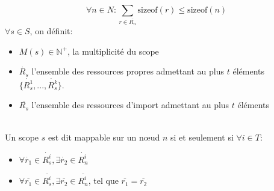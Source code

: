 \documentclass[11pt,a4paper]{article} %
\begin{document}
\[
\forall n \in N : \sum_{r \in \overline{R_n}} \mbox{sizeof}(r) \leq \mbox{sizeof}(n)
\]
$\forall s \in S$, on définit:\begin{itemize}
\item $ M(s) \in \mathbb{N}^+ $, la multiplicité du scope 
\item $\dot{R_s}$ l'ensemble des ressources propres admettant au plus $t$ éléments $\{\dot{R^1_s},...,\dot{R^k_s}\}$.
\item $\overline{R_s}$ l'ensemble des ressources d'import admettant au plus $t$ éléments\\\\
\end{itemize}
Un scope $s$ est dit mappable sur un nœud $n$ si et seulement si $\forall i \in T$:\begin{itemize}
\item $\forall \dot{r_1} \in \dot{R_s^i}, \exists \dot{r_2} \in \dot{R_n^i}$
\item $\forall \overline{r_1} \in \overline{R_s^i}, \exists \overline{r_2} \in \overline{R_n^i}$, tel que $\overline{r_1} = \overline{r_2}$\\
\end{itemize}
\end{document}
